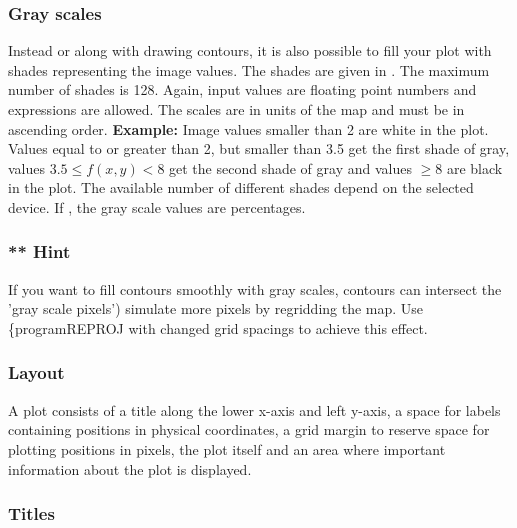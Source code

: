               
\subsubsection*{Gray scales}
              
Instead or along with drawing contours, it is also
possible to fill your plot with shades representing the
image values. The shades are given in . The maximum
number of shades is 128. Again, input values are floating
point numbers and expressions are allowed. The scales are
in units of the map and must be in ascending order.
{\bf Example:} 
Image values smaller than 2 are white in the plot. Values
equal to or greater than 2, but smaller than 3.5 get the first 
shade of gray, values $3.5 \leq f(x,y) < 8$ get the second
shade of gray and values $\geq 8$ are black in the plot. The
available number of different shades depend on the
selected device. If , the gray scale values are
percentages.

\subsubsection*{** Hint}
     
If you want to fill contours smoothly with gray scales,
contours can intersect the 'gray scale pixels')
simulate more pixels by regridding the map. Use \{program{REPROJ}
with changed grid spacings to achieve this effect.

             
\subsubsection*{Layout}
              
A plot consists of a title along the lower x-axis and left
y-axis, a space for labels containing positions in
physical coordinates, a grid margin to reserve space for
plotting positions in pixels, the plot itself and an area
where important information about the plot is displayed.
              
             
\subsubsection*{Titles}
              
